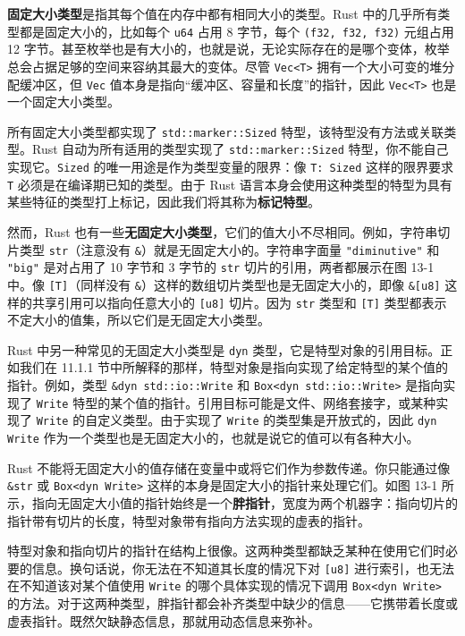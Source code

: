 \textbf{固定大小类型}是指其每个值在内存中都有相同大小的类型。Rust 中的几乎所有类型都是固定大小的，比如每个 \texttt{u64} 占用 8 字节，每个 \texttt{(f32, f32, f32)} 元组占用 12 字节。甚至枚举也是有大小的，也就是说，无论实际存在的是哪个变体，枚举总会占据足够的空间来容纳其最大的变体。尽管 \texttt{Vec<T>} 拥有一个大小可变的堆分配缓冲区，但 \texttt{Vec} 值本身是指向“缓冲区、容量和长度”的指针，因此 \texttt{Vec<T>} 也是一个固定大小类型。

所有固定大小类型都实现了 \texttt{std::marker::Sized} 特型，该特型没有方法或关联类型。Rust 自动为所有适用的类型实现了 \texttt{std::marker::Sized} 特型，你不能自己实现它。\texttt{Sized} 的唯一用途是作为类型变量的限界：像 \texttt{T: Sized} 这样的限界要求 \texttt{T} 必须是在编译期已知的类型。由于 Rust 语言本身会使用这种类型的特型为具有某些特征的类型打上标记，因此我们将其称为\textbf{标记特型}。

然而，Rust 也有一些\textbf{无固定大小类型}，它们的值大小不尽相同。例如，字符串切片类型 \texttt{str}（注意没有 \texttt{\&}）就是无固定大小的。字符串字面量 \texttt{"diminutive"} 和 \texttt{"big"} 是对占用了 10 字节和 3 字节的 \texttt{str} 切片的引用，两者都展示在图 13-1 中。像 \texttt{[T]}（同样没有 \texttt{\&}）这样的数组切片类型也是无固定大小的，即像 \texttt{\&[u8]} 这样的共享引用可以指向任意大小的 \texttt{[u8]} 切片。因为 \texttt{str} 类型和 \texttt{[T]} 类型都表示不定大小的值集，所以它们是无固定大小类型。


Rust 中另一种常见的无固定大小类型是 \texttt{dyn} 类型，它是特型对象的引用目标。正如我们在 11.1.1 节中所解释的那样，特型对象是指向实现了给定特型的某个值的指针。例如，类型 \texttt{\&dyn std::io::Write} 和 \texttt{Box<dyn std::io::Write>} 是指向实现了 \texttt{Write} 特型的某个值的指针。引用目标可能是文件、网络套接字，或某种实现了 \texttt{Write} 的自定义类型。由于实现了 \texttt{Write} 的类型集是开放式的，因此 \texttt{dyn Write} 作为一个类型也是无固定大小的，也就是说它的值可以有各种大小。

Rust 不能将无固定大小的值存储在变量中或将它们作为参数传递。你只能通过像 \texttt{\&str} 或 \texttt{Box<dyn Write>} 这样的本身是固定大小的指针来处理它们。如图 13-1 所示，指向无固定大小值的指针始终是一个\textbf{胖指针}，宽度为两个机器字：指向切片的指针带有切片的长度，特型对象带有指向方法实现的虚表的指针。

特型对象和指向切片的指针在结构上很像。这两种类型都缺乏某种在使用它们时必要的信息。换句话说，你无法在不知道其长度的情况下对 \texttt{[u8]} 进行索引，也无法在不知道该对某个值使用 \texttt{Write} 的哪个具体实现的情况下调用 \texttt{Box<dyn Write>} 的方法。对于这两种类型，胖指针都会补齐类型中缺少的信息——它携带着长度或虚表指针。既然欠缺静态信息，那就用动态信息来弥补。


